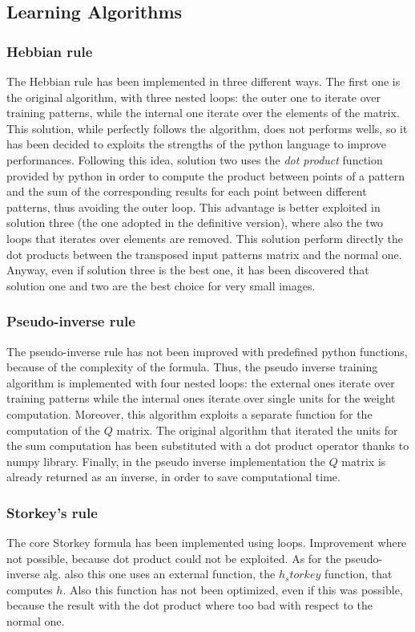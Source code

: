 \documentclass[letterpaper,twocolumn,10pt]{article}
\begin{document}
\subsection{Learning Algorithms}
\subsubsection{Hebbian rule}
The Hebbian rule has been implemented in three different ways. The first one is the original algorithm, with three nested loops: the outer one to iterate over training patterns, while the internal one iterate over the elements of the matrix. This solution, while perfectly follows the algorithm, does not performs wells, so it has been decided to exploits the strengths of the python language to improve performances. Following this idea, solution two uses the \emph{dot product} function provided by python in order to compute the product between points of a pattern and the sum of the corresponding results for each point between different patterns, thus avoiding the outer loop. This advantage is better exploited in solution three (the one adopted in the definitive version), where also the two loops that iterates over elements are removed. This solution perform directly the dot products between the transposed input patterns matrix and the normal one. Anyway, even if solution three is the best one, it has been discovered that solution one and two are the best choice for very small images.
\subsubsection{Pseudo-inverse rule}
The pseudo-inverse rule has not been improved with predefined python functions, because of the complexity of the formula. Thus, the pseudo inverse training algorithm is implemented with four nested loops: the external ones iterate over training patterns while the internal ones iterate over single units for the weight computation. Moreover, this algorithm exploits a separate function for the computation of the $Q$ matrix. The original algorithm that iterated the units for the sum computation has been substituted with a dot product operator thanks to numpy library. Finally, in the pseudo inverse implementation the $Q$ matrix is already returned as an inverse, in order to save computational time. 
\subsubsection{Storkey's rule}
The core Storkey formula has been implemented using loops. Improvement where not possible, because dot product could not be exploited. As for the pseudo-inverse alg. also this one uses an external function, the $h_storkey$ function, that computes $h$. Also this function has not been optimized, even if this was possible, because the result with the dot product where too bad with respect to the normal one.\\ 
\end{document}
